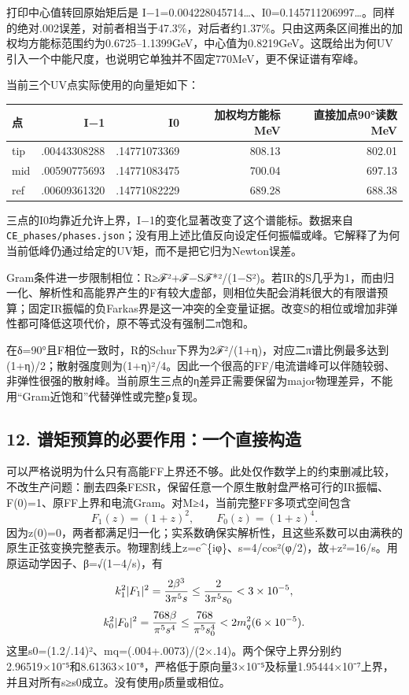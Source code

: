 \documentclass[
  10pt,
  a4paper,
]{article}
\newcounter{none} %
\begin{document}
打印中心值转回原始矩后是
I−1=0.004228045714\ldots、I0=0.145711206997\ldots。同样的绝对.002误差，对前者相当于47.3\%，对后者约1.37\%。只由这两条区间推出的加权均方能标范围约为0.6725--1.1399GeV，中心值为0.8219GeV。这既给出为何UV引入一个中能尺度，也说明它单独并不固定770MeV，更不保证谱有窄峰。

当前三个UV点实际使用的向量矩如下：

{\def\LTcaptype{none} %
\begin{longtable}[]{@{}lrrrr@{}}
\toprule\noalign{}
点 & I−1 & I0 & 加权均方能标 MeV & 直接加点90°读数 MeV \\
\midrule\noalign{}
\endhead
\bottomrule\noalign{}
\endlastfoot
tip & .00443308288 & .14771073369 & 808.13 & 802.01 \\
mid & .00590775693 & .14771083475 & 700.04 & 697.13 \\
ref & .00609361320 & .14771082229 & 689.28 & 688.38 \\
\end{longtable}
}

三点的I0均靠近允许上界，I−1的变化显著改变了这个谱能标。数据来自
\texttt{CE\_phases/phases.json}；没有用上述比值反向设定任何振幅或峰。它解释了为何当前低峰仍通过给定的UV矩，而不是把它归为Newton误差。

Gram条件进一步限制相位：R≥\textbar ℱ\textbar²+\textbar ℱ−Sℱ*\textbar²/(1−\textbar S\textbar²)。若IR的S几乎为1，而由归一化、解析性和高能界产生的F有较大虚部，则相位失配会消耗很大的有限谱预算；固定IR振幅的负Farkas界是这一冲突的全变量证据。改变S的相位或增加非弹性都可降低这项代价，原不等式没有强制二π饱和。

在δ=90°且F相位一致时，R的Schur下界为2\textbar ℱ\textbar²/(1+η)，对应二π谱比例最多达到(1+η)/2；散射强度则为(1+η)²/4。因此一个很高的FF/电流谱峰可以伴随较弱、非弹性很强的散射峰。当前原生三点的η差异正需要保留为major物理差异，不能用``Gram近饱和''代替弹性或完整ρ复现。

\subsection{12.
谱矩预算的必要作用：一个直接构造}\label{ux8c31ux77e9ux9884ux7b97ux7684ux5fc5ux8981ux4f5cux7528ux4e00ux4e2aux76f4ux63a5ux6784ux9020}

可以严格说明为什么只有高能FF上界还不够。此处仅作数学上的约束删减比较，不改生产问题：删去四条FESR，保留任意一个原生散射盘严格可行的IR振幅、F(0)=1、原FF上界和电流Gram。对M≥4，当前完整FF多项式空间包含
\[
F_1(z)=(1+z)^2,\qquad F_0(z)=(1+z)^4.
\]
因为z(0)=0，两者都满足归一化；实系数确保实解析性，且这些系数可以由满秩的原生正弦变换完整表示。物理割线上z=e\^{}\{iφ\}、s=4/cos²(φ/2)，故+z\textbar²=16/s。用原运动学因子、β=√(1−4/s)，有
\[
k_1^2|F_1|^2={2\beta^3\over3\pi^5s}
\le{2\over3\pi^5s_0}<3\times10^{-5},
\] \[
k_0^2|F_0|^2={768\beta\over\pi^5s^4}
\le{768\over\pi^5s_0^4}<2m_q^2(6\times10^{-5}).
\]
这里s0=(1.2/.14)²、mq=(.004+.0073)/(2×.14)。两个保守上界分别约2.96519×10⁻⁵和8.61363×10⁻⁸，严格低于原向量3×10⁻⁵及标量1.95444×10⁻⁷上界，并且对所有s≥s0成立。没有使用ρ质量或相位。
\end{document}
